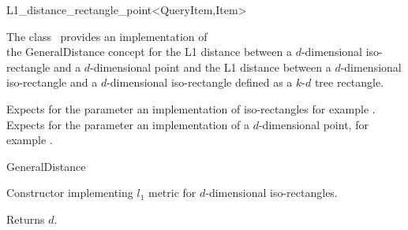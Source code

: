 

\begin{ccRefClass}{L1_distance_rectangle_point<QueryItem,Item>}  %


\ccDefinition

The class \ccRefName\ provides an implementation of \\
the GeneralDistance concept
for the L1 distance between a $d$-dimensional iso-rectangle and a $d$-dimensional point 
and the L1 distance between a $d$-dimensional iso-rectangle
and a $d$-dimensional iso-rectangle defined as a $k$-$d$ tree rectangle.


\ccParameters

Expects for the parameter 
 an implementation of iso-rectangles
for example .
Expects for the parameter  an implementation
of a $d$-dimensional point, for example .

\ccIsModel

GeneralDistance

\ccTypes


\ccCreation
{}  %


{Constructor implementing $l_1$ metric for
$d$-dimensional iso-rectangles.}


 {Returns $d$.}


\end{ccRefClass}
